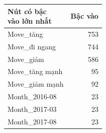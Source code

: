 \begin{tabular}{lr}
\toprule
\makecell[l]{Nút có bậc\\vào lớn nhất} & Bậc vào \\
\midrule
Move\_tăng & 753 \\
Move\_đi ngang & 744 \\
Move\_giảm & 586 \\
Move\_tăng mạnh & 95 \\
Move\_giảm mạnh & 92 \\
Month\_2016-08 & 23 \\
Month\_2017-03 & 23 \\
Month\_2017-08 & 23 \\
\bottomrule
\end{tabular}
